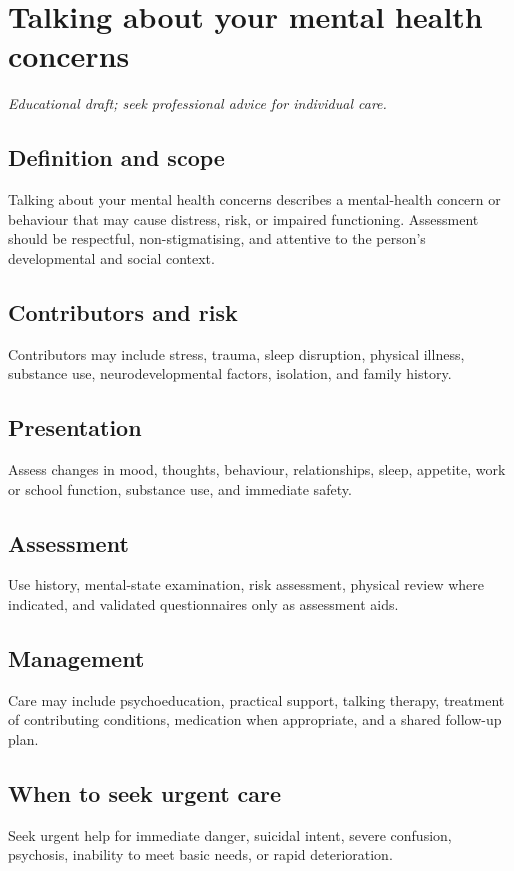 \chapter{Talking about your mental health concerns}
\medskip
\noindent\textit{Educational draft; seek professional advice for individual care.}

\section*{Definition and scope}
Talking about your mental health concerns describes a mental-health concern or behaviour that may cause distress, risk, or impaired functioning. Assessment should be respectful, non-stigmatising, and attentive to the person’s developmental and social context.

\section*{Contributors and risk}
Contributors may include stress, trauma, sleep disruption, physical illness, substance use, neurodevelopmental factors, isolation, and family history.

\section*{Presentation}
Assess changes in mood, thoughts, behaviour, relationships, sleep, appetite, work or school function, substance use, and immediate safety.

\section*{Assessment}
Use history, mental-state examination, risk assessment, physical review where indicated, and validated questionnaires only as assessment aids.

\section*{Management}
Care may include psychoeducation, practical support, talking therapy, treatment of contributing conditions, medication when appropriate, and a shared follow-up plan.

\section*{When to seek urgent care}
Seek urgent help for immediate danger, suicidal intent, severe confusion, psychosis, inability to meet basic needs, or rapid deterioration.

